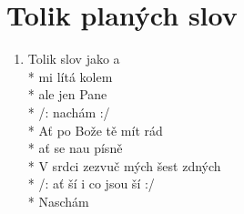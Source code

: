 \section{Tolik planých slov}
\begin{enumerate}
\item[] Tolik  slov jako  a  \\*
mi lítá kolem  \\*
ale  jen Pane   \\*
/: nachám   :/ \\*
Ať po Bože                 tě mít rád \\*
ať se  nau  písně   \\*
V srdci zezvuč mých šest zdných  \\*
/: ať ší i  co jsou ší :/ \\*
Naschám    
\end{enumerate}
